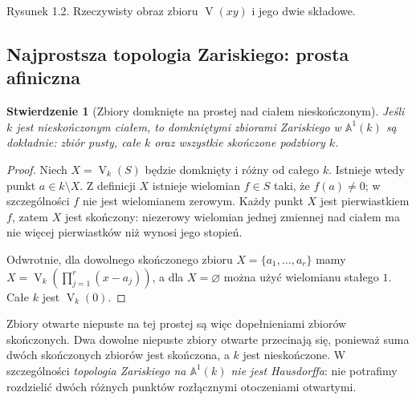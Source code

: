 \documentclass[11pt,a4paper,openany]{report}
\numberwithin{equation}{section}
\theoremstyle{plain}
\newtheorem{stwierdzenie}[twierdzenie]{Stwierdzenie}
\theoremstyle{definition}
\theoremstyle{remark}
\newcommand{\A}{\mathbb A}
\newcommand{\V}{\operatorname V}
\begin{document}
\begin{center}
\end{center}
\begin{center}\small Rysunek 1.2. Rzeczywisty obraz zbioru $\V(xy)$ i jego dwie składowe.\end{center}

\subsection{Najprostsza topologia Zariskiego: prosta afiniczna}

\begin{stwierdzenie}[Zbiory domknięte na prostej nad ciałem nieskończonym]
\label{st:A1-top}
Jeśli $k$ jest nieskończonym ciałem, to domkniętymi zbiorami
Zariskiego w $\A^1(k)$ są dokładnie: zbiór pusty, całe $k$
oraz wszystkie skończone podzbiory $k$.
\end{stwierdzenie}
\begin{proof}
Niech $X=\V_k(S)$ będzie domknięty i różny od całego $k$.
Istnieje wtedy punkt $a\in k\setminus X$. Z definicji $X$
istnieje wielomian $f\in S$ taki, że $f(a)\ne0$;
w szczególności $f$ nie jest wielomianem zerowym.
Każdy punkt $X$ jest pierwiastkiem $f$, zatem $X$ jest skończony:
niezerowy wielomian jednej zmiennej nad ciałem ma nie więcej
pierwiastków niż wynosi jego stopień.

Odwrotnie, dla dowolnego skończonego zbioru
$X=\{a_1,\dots,a_r\}$ mamy
$X=\V_k(\prod_{j=1}^r(x-a_j))$, a dla $X=\varnothing$
można użyć wielomianu stałego $1$. Całe $k$ jest $\V_k(0)$.
\end{proof}

Zbiory otwarte niepuste na tej prostej są więc dopełnieniami
zbiorów skończonych. Dwa dowolne niepuste zbiory otwarte przecinają się,
ponieważ suma dwóch skończonych zbiorów jest skończona, a $k$ jest
nieskończone. W szczególności \emph{topologia Zariskiego na $\A^1(k)$
nie jest Hausdorffa}: nie potrafimy rozdzielić dwóch różnych punktów
rozłącznymi otoczeniami otwartymi.
\end{document}
